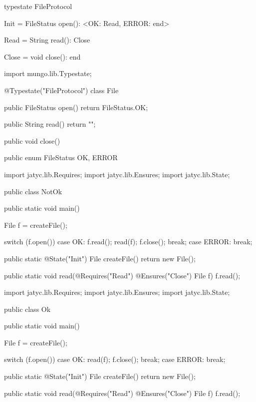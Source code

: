 \begin{code}
typestate FileProtocol {

  Init = {
    FileStatus open(): <OK: Read, ERROR: end>
  }

  Read = {
    String read(): Close
  }

  Close = {
    void close(): end
  }

}\end{code}

\begin{code}
import mungo.lib.Typestate;

@Typestate("FileProtocol")
class File {

  public FileStatus open() {
    return FileStatus.OK;
  }

  public String read() {
    return "";
  }

  public void close() {
  }

}\end{code}

\begin{code}
public enum FileStatus {
  OK, ERROR
}\end{code}

\begin{code}
import jatyc.lib.Requires;
import jatyc.lib.Ensures;
import jatyc.lib.State;

public class NotOk {

  public static void main() {
    File f = createFile();

    switch (f.open()) {
      case OK:
        f.read();
        read(f);
        f.close();
        break;
      case ERROR:
        break;
    }
  }

  public static @State("Init") File createFile() {
    return new File();
  }

  public static void read(@Requires("Read") @Ensures("Close") File f) {
    f.read();
  }

}\end{code}

\begin{code}
import jatyc.lib.Requires;
import jatyc.lib.Ensures;
import jatyc.lib.State;

public class Ok {

  public static void main() {
    File f = createFile();

    switch (f.open()) {
      case OK:
        read(f);
        f.close();
        break;
      case ERROR:
        break;
    }
  }

  public static @State("Init") File createFile() {
    return new File();
  }

  public static void read(@Requires("Read") @Ensures("Close") File f) {
    f.read();
  }

}\end{code}

